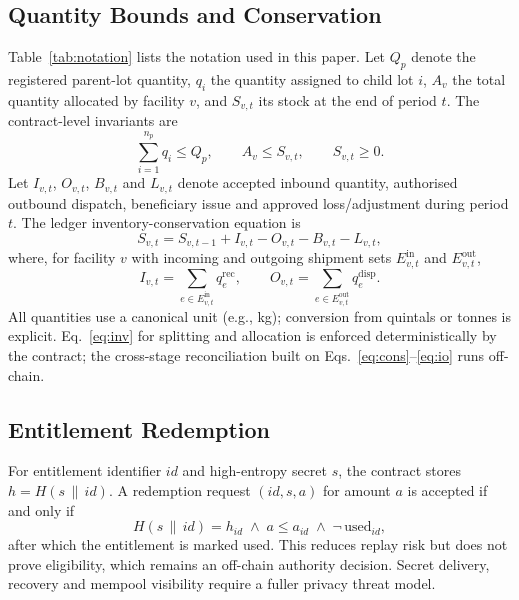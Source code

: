 \documentclass[conference,a4paper]{IEEEtran}
\newcommand{\qdisp}{q^{\mathrm{disp}}}
\newcommand{\qrec}{q^{\mathrm{rec}}}
\begin{document}
\subsection{Quantity Bounds and Conservation}
Table~\ref{tab:notation} lists the notation used in this paper. Let $Q_p$ denote the registered parent-lot quantity, $q_i$ the quantity assigned to child lot $i$, $A_v$ the total quantity allocated by facility $v$, and $S_{v,t}$ its stock at the end of period $t$. The contract-level invariants are
\begin{equation}
\sum_{i=1}^{n_p} q_i \le Q_p,\qquad A_v \le S_{v,t},\qquad S_{v,t}\ge 0.
\label{eq:inv}
\end{equation}
Let $I_{v,t}$, $O_{v,t}$, $B_{v,t}$ and $L_{v,t}$ denote accepted inbound quantity, authorised outbound dispatch, beneficiary issue and approved loss/adjustment during period $t$. The ledger inventory-conservation equation is
\begin{equation}
S_{v,t}=S_{v,t-1}+I_{v,t}-O_{v,t}-B_{v,t}-L_{v,t},
\label{eq:cons}
\end{equation}
where, for facility $v$ with incoming and outgoing shipment sets $E^{\mathrm{in}}_{v,t}$ and $E^{\mathrm{out}}_{v,t}$,
\begin{equation}
I_{v,t}=\sum_{e\in E^{\mathrm{in}}_{v,t}}\qrec_e,\qquad O_{v,t}=\sum_{e\in E^{\mathrm{out}}_{v,t}}\qdisp_e.
\label{eq:io}
\end{equation}
All quantities use a canonical unit (e.g., kg); conversion from quintals or tonnes is explicit. Eq.~\eqref{eq:inv} for splitting and allocation is enforced deterministically by the contract; the cross-stage reconciliation built on Eqs.~\eqref{eq:cons}--\eqref{eq:io} runs off-chain.

\subsection{Entitlement Redemption}
For entitlement identifier $id$ and high-entropy secret $s$, the contract stores $h=H(s\,\|\,id)$. A redemption request $(id,s,a)$ for amount $a$ is accepted if and only if
\begin{equation}
H(s\,\|\,id)=h_{id}\;\wedge\;a\le a_{id}\;\wedge\;\neg\,\mathrm{used}_{id},
\label{eq:redeem}
\end{equation}
after which the entitlement is marked used. This reduces replay risk but does not prove eligibility, which remains an off-chain authority decision. Secret delivery, recovery and mempool visibility require a fuller privacy threat model.
\end{document}
